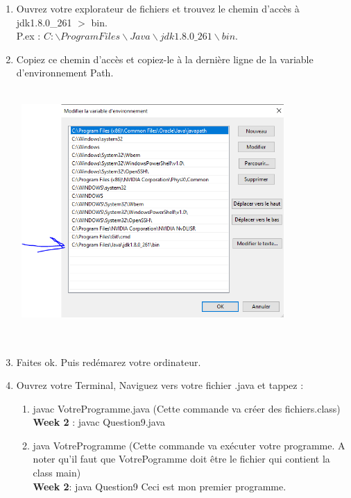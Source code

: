 \begin{enumerate}
    \item Ouvrez votre explorateur de fichiers et trouvez le chemin d'accès à jdk1.8.0\_261 $>$ bin. \\P.ex : $C:\backslash Program Files\backslash Java\backslash jdk1.8.0\_261\backslash bin.$\\
    \item Copiez ce chemin d'accès et copiez-le à la dernière ligne de la variable d'environnement Path.\\\
    \includegraphics[width = 10cm, height = 10cm]{img/Res3.PNG}\\
    \item Faites ok. Puis redémarez votre ordinateur.
    \item Ouvrez votre Terminal, Naviguez vers votre fichier .java et tappez :
        \begin{enumerate}
            \item javac VotreProgramme.java (Cette commande va créer des fichiers.class)\\
            \textbf{Week 2} : javac Question9.java
            \item java VotreProgramme (Cette commande va exécuter votre programme. A noter qu'il faut que VotrePogramme doit être le fichier qui contient la class main)
            \\\textbf{Week 2}: java Question9 Ceci est mon premier programme.
        \end{enumerate}
    
\end{enumerate}



